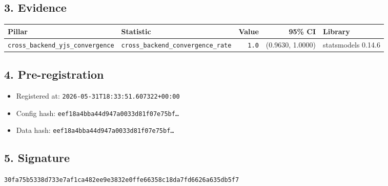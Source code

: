 \documentclass{article}
\begin{document}
\subsection*{3. Evidence}
\begin{tabular}{llrrl}\toprule
\textbf{Pillar} & \textbf{Statistic} & \textbf{Value} & \textbf{95\% CI} & \textbf{Library} \\\midrule
\texttt{cross\_backend\_yjs\_convergence} & \texttt{cross\_backend\_convergence\_rate} & \texttt{1.0} & (0.9630, 1.0000) & statsmodels 0.14.6 \\
\bottomrule\end{tabular}
\subsection*{4. Pre-registration}
\begin{itemize}
\item Registered at: \texttt{2026-05-31T18:33:51.607322+00:00}
\item Config hash: \texttt{eef18a4bba44d947a0033d81f07e75bf\dots}
\item Data hash: \texttt{eef18a4bba44d947a0033d81f07e75bf\dots}
\end{itemize}
\subsection*{5. Signature}
\texttt{30fa75b5338d733e7af1ca482ee9e3832e0ffe66358c18da7fd6626a635db5f7}\\
\end{document}
